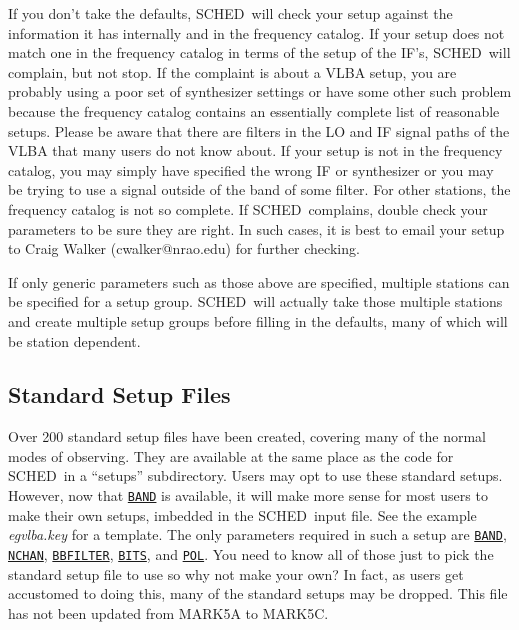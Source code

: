 \documentclass{report}
\newcommand{\schedb}{{\sc SCHED~}}
\begin{document}
If you don't take the defaults, \schedb will check your setup against
the information it has internally and in the frequency catalog.  If
your setup does not match one in the frequency catalog in terms of the
setup of the IF's, \schedb will complain, but not stop.  If the
complaint is about a VLBA setup, you are probably using a poor set of
synthesizer settings or have some other such problem because the
frequency catalog contains an essentially complete list of reasonable
setups.  Please be aware that there are filters in the LO and IF
signal paths of the VLBA that many users do not know about.  If your
setup is not in the frequency catalog, you may simply have specified
the wrong IF or synthesizer or you may be trying to use a signal
outside of the band of some filter.  For other stations, the frequency
catalog is not so complete.  If \schedb complains, double check your
parameters to be sure they are right.  In such cases, it is best to
email your setup to Craig Walker (cwalker@nrao.edu) for further
checking.

If only generic parameters such as those above are specified,
multiple stations can be specified for a setup group.  \schedb will
actually take those multiple stations and create multiple setup
groups before filling in the defaults, many of which will be
station dependent.

\subsection{\label{SSEC:SETSTD}Standard Setup Files}

Over 200 standard setup files have been created, covering many of the
normal modes of observing.  They are available at the same place as
the code for \schedb in a ``setups'' subdirectory.  Users may opt
to use these standard setups.  However, now that 
{\hyperref[SP:BAND]{{\tt BAND}}}
is available, it will make more sense for most users
to make their own setups, imbedded in the \schedb input file.  See
the example {\sl egvlba.key} for a template.  The only parameters
required in such a setup are 
{\hyperref[SP:BAND]{{\tt BAND}}},
{\hyperref[SP:NCHAN]{{\tt NCHAN}}}, 
{\hyperref[SP:BBFILTER]{{\tt BBFILTER}}},
{\hyperref[SP:BITS]{{\tt BITS}}}, and 
{\hyperref[SP:POL]{{\tt POL}}}.
You need to know all of those just to pick the standard setup file
to use so why not make your own?  In fact, as users get accustomed
to doing this, many of the standard setups may be dropped.
This file has not been updated from MARK5A to MARK5C.
\end{document}
